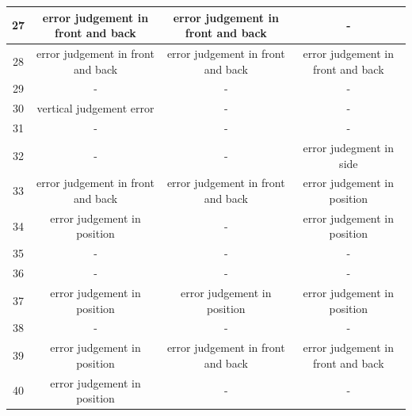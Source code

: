 \documentclass[journal,10pt]{IEEEtran}
\begin{document}
\begin{table}[]
{\begin{tabular}{|c|c|c|c|}
    27              & error judgement in front and back & error judgement in front and back & -                                 \\ \hline
    28              & error judgement in front and back & error judgement in front and back & error judgement in front and back \\ \hline
    29              & -                                 & -                                 & -                                 \\ \hline
    30              & vertical judgement error          & -                                 & -                                 \\ \hline
    31              & -                                 & -                                 & -                                 \\ \hline
    32              & -                                 & -                                 & error judegment in side           \\ \hline
    33              & error judgement in front and back & error judgement in front and back & error judgement in position       \\ \hline
    34              & error judgement in position       & -                                 & error judgement in position       \\ \hline
    35              & -                                 & -                                 & -                                 \\ \hline
    36              & -                                 & -                                 & -                                 \\ \hline
    37              & error judgement in position       & error judgement in position       & error judgement in position       \\ \hline
    38              & -                                 & -                                 & -                                 \\ \hline
    39              & error judgement in position       & error judgement in front and back & error judgement in front and back \\ \hline
    40              & error judgement in position       & -                                 & -                                 \\ \hline
    \end{tabular}%
    }
\end{table}
\end{document}
